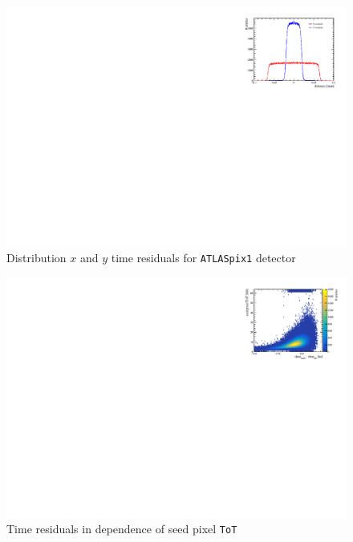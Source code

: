 \documentclass[twocolumn,DIV=14,a4paper,biblatex, 10pt]{scrartcl}
\newcommand{\atlaspix}{\texttt{ATLASpix1}\xspace}
\newcommand{\tot}{\texttt{ToT}\xspace}
\begin{document}
\begin{figure}
  \begin{center}
    \includegraphics{residuals_x_y}
  \end{center}
  \caption{Distribution $x$ and $y$ time residuals for \atlaspix detector\label{fig:xy_res}}
\end{figure}

\begin{figure}
  \begin{center}
    \includegraphics{time_residuals_over_tot}
  \end{center}
  \caption{Time residuals in dependence of seed pixel \tot\label{fig:time_over_tot}}
\end{figure}

\cite{schimassek2020test}
\cite{schoning2020mupix}
\printbibliography
\end{document}
